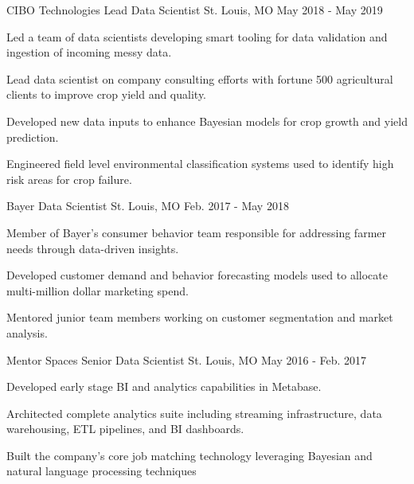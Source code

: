 \begin{cventries}
    \vspace{1em}

    \cventry
        {CIBO Technologies} %
        {Lead Data Scientist} %
        {St. Louis, MO} %
        {May 2018 - May 2019} %
        {
        \begin{cvitems} %
            \item {Led a team of data scientists developing smart tooling for data validation and ingestion of incoming messy data.}
            \item {Lead data scientist on company consulting efforts with fortune 500 agricultural clients to improve crop yield and quality.}
            \item {Developed new data inputs to enhance Bayesian models for crop growth and yield prediction.} 
            \item {Engineered field level environmental classification systems used to identify high risk areas for crop failure.}
        \end{cvitems}
        }
    
    \vspace{1em}

    \cventry
        {Bayer} %
        {Data Scientist} %
        {St. Louis, MO} %
        {Feb. 2017 - May 2018} %
        {
        \begin{cvitems} %
            \item {Member of Bayer's consumer behavior team responsible for addressing farmer needs through data-driven insights.}
            \item {Developed customer demand and behavior forecasting models used to allocate multi-million dollar marketing spend.}
            \item {Mentored junior team members working on customer segmentation and market analysis.}
        \end{cvitems}
        }
        
    \vspace{1em}

    \cventry
        {Mentor Spaces} %
        {Senior Data Scientist} %
        {St. Louis, MO} %
        {May 2016 - Feb. 2017} %
        {
        \begin{cvitems} %
            \item {Developed early stage BI and analytics capabilities in Metabase.}
            \item {Architected complete analytics suite including streaming infrastructure, data warehousing, ETL pipelines, and BI dashboards.}
            \item {Built the company's core job matching technology leveraging Bayesian and natural language processing techniques}
        \end{cvitems}
        }
        \vspace{1em}


\end{cventries}
